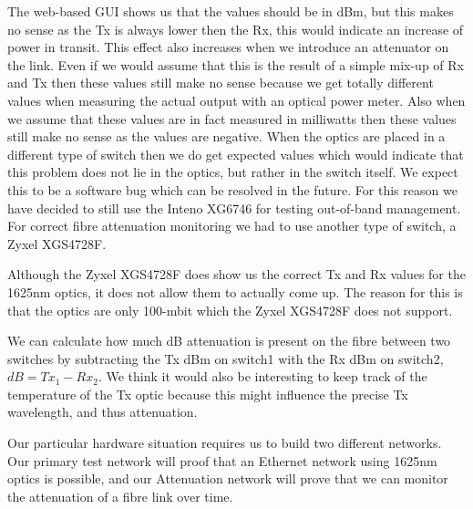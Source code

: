 \documentclass{article}
\begin{document}
The web-based GUI shows us that the values should be in dBm, but this makes no sense as the Tx is always lower then the Rx, this would indicate an increase of power in transit. This effect also increases when we introduce an attenuator on the link. Even if we would assume that this is the result of a simple mix-up of Rx and Tx then these values still make no sense because we get totally different values when measuring the actual output with an optical power meter. Also when we assume that these values are in fact measured in milliwatts then these values still make no sense as the values are negative. When the optics are placed in a different type of switch then we do get expected values which would indicate that this problem does not lie in the optics, but rather in the switch itself. We expect this to be a software bug which can be resolved in the future. For this reason we have decided to still use the Inteno XG6746 for testing out-of-band management. For correct fibre attenuation monitoring we had to use another type of switch, a Zyxel XGS4728F.

Although the Zyxel XGS4728F does show us the correct Tx and Rx values for the 1625nm optics, it does not allow them to actually come up. The reason for this is that the optics are only 100-mbit which the Zyxel XGS4728F does not support. 

We can calculate how much dB attenuation is present on the fibre between two switches by subtracting the Tx dBm on switch1 with the Rx dBm on switch2, $dB=Tx_1-Rx_2$. We think it would also be interesting to keep track of the temperature of the Tx optic because this might influence the precise Tx wavelength, and thus attenuation.

Our particular hardware situation requires us to build two different networks. Our primary test network will proof that an Ethernet network using 1625nm optics is possible, and our Attenuation network will prove that we can monitor the attenuation of a fibre link over time.
\end{document}
